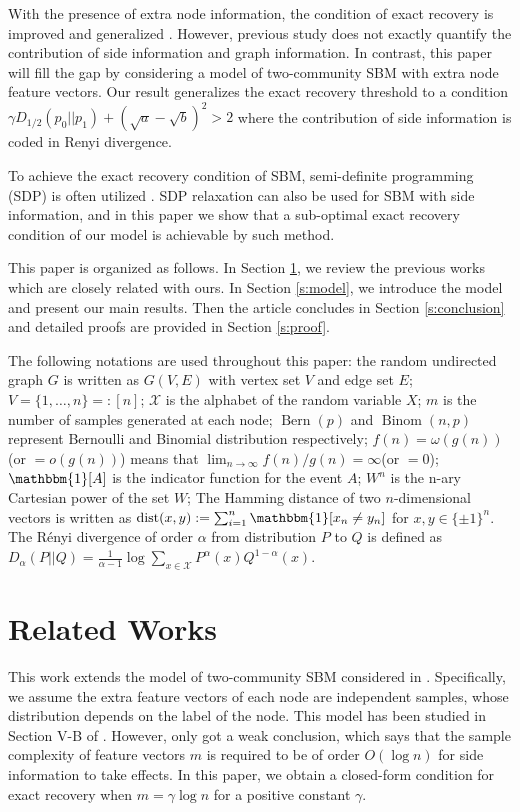 \documentclass[conference]{IEEEtran}
\DeclareMathOperator{\dist}{dist}
\DeclareMathOperator{\Bern}{Bern}
\DeclareMathOperator{\Binom}{Binom}
\begin{document}
With the presence of extra node information, the condition of exact recovery is improved
and generalized \cite{saad2018community, abbe17sideinfo}. However, previous study does not exactly quantify the contribution of side information and graph information. In contrast, this paper will fill the gap by considering a model of two-community SBM with extra node feature vectors. Our result generalizes
the exact recovery threshold to a condition $\gamma D_{1/2}(p_0 || p_1) + (\sqrt{a} - \sqrt{b})^2 > 2$
where the contribution of side information is coded in Renyi divergence.

To achieve the exact recovery condition of SBM, semi-definite programming (SDP) is often utilized \cite{Hajek16}.
SDP relaxation can also be used for SBM with side information, and in this paper we show that a sub-optimal exact recovery condition
of our model is achievable by such method.

This paper is organized as follows. In Section \ref{s:rw}, we review the previous works which are closely related with ours.
In Section \ref{s:model}, we introduce the model and present our main results.
Then the article concludes in Section \ref{s:conclusion} and
detailed proofs are provided in Section \ref{s:proof}.

The following notations are used throughout this paper: 
the random undirected graph $G$ is written as $G(V,E)$ with vertex set $V$ and edge set $E$;
$V=\{1,\dots, n\} =: [n]$;
$\mathcal{X}$ is the alphabet
of the random variable $X$; $m$ is the number of samples generated at each node;
$\Bern(p)$ and $\Binom(n,p)$ represent Bernoulli
and Binomial distribution respectively; $f(n)=\omega(g(n))$(or $=o(g(n))$) means that $\lim_{n\to \infty} f(n) / g(n) = \infty $(or $=0$);
$\mathbbm{1}[A]$ is the indicator function for the event $A$; $W^n$ is the n-ary Cartesian power of the set $W$;
The Hamming distance of 
two $n$-dimensional vectors is written as $\dist(x,y):=\sum_{i=1}^n \mathbbm{1}[x_n\neq y_n]$ for $x,y\in \{\pm 1 \}^n$. The Rényi divergence of order $\alpha$ from distribution $P$ to $Q$ is defined
as $D_{\alpha}(P||Q) = \frac{1}{\alpha - 1} \log \sum_{x\in \mathcal{X}} P^{\alpha}(x)Q^{1-\alpha}(x) $.

\section{Related Works}\label{s:rw}
This work extends the model of two-community SBM considered in \cite{abbe2015community}.
Specifically, we assume the extra feature vectors of each node are independent samples, whose distribution depends on the label of the node.
This model has been studied in Section V-B of \cite{saad2018community}. However,
\cite{saad2018community} only got a weak conclusion, which says that the sample complexity of feature vectors
$m$ is required to be of order $O(\log n)$ for side information to take effects. In this paper, we obtain
a closed-form condition for exact recovery when $m=\gamma \log n$ for a positive constant $\gamma$.
\end{document}
